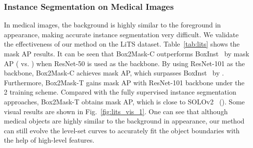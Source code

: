 \documentclass[12pt,onecolumn,letterpaper]{article}
\begin{document}
\subsubsection{Instance Segmentation on Medical Images}
In medical images, the background is highly similar to the foreground in appearance, making accurate instance segmentation very difficult. We validate the effectiveness of our method on the LiTS dataset. Table~\ref{tab:lits} shows the mask AP results. It can be seen that Box2Mask-C outperforms BoxInst~\cite{cvpr2021_boxinst} by  mask AP ( vs. ) when ResNet-50 is used as the backbone. By using ResNet-101 as the backbone, Box2Mask-C achieves  mask AP, which surpasses BoxInst~\cite{cvpr2021_boxinst} by . 
Furthermore, Box2Mask-T gains  mask AP with ResNet-101 backbone under the 2 training scheme.
Compared with the fully supervised instance segmentation approaches, Box2Mask-T obtains  mask AP, which is close to SOLOv2~\cite{wang2020solov2} (). Some visual results are shown in Fig.~\ref{fig:lits_vis_1}. One can see that although medical objects are highly similar to the background in appearance, our method can still evolve the level-set curves to accurately fit the object boundaries with the help of high-level features.

\begin{table}[t]
	\renewcommand\arraystretch{0.88}
	\centering
	\caption{Instance segmentation results on medical image dataset LiTS \texttt{val}. Unless specified, all models are trained with 640640 input size with 1 training schedule. ``" denotes the method using multi-scale training with 2 training schedule.} 
\label{tab:lits}
\end{table}
\end{document}

